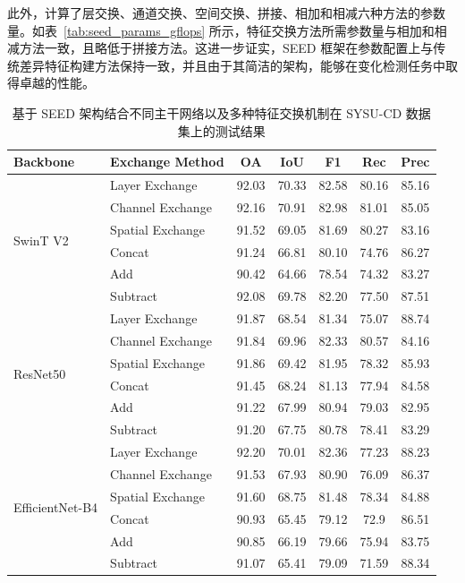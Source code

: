 此外，计算了层交换、通道交换、空间交换、拼接、相加和相减六种方法的参数量。如表~\ref{tab:seed_params_gflops} 所示，特征交换方法所需参数量与相加和相减方法一致，且略低于拼接方法。这进一步证实，SEED 框架在参数配置上与传统差异特征构建方法保持一致，并且由于其简洁的架构，能够在变化检测任务中取得卓越的性能。


\begin{table}[!htbp]
\centering
\caption{基于 SEED 架构结合不同主干网络以及多种特征交换机制在 SYSU-CD 数据集上的测试结果}
\label{tab:seed_sysu_backbone}
\begin{tabular}{l l c c c c c}
\hline
\textbf{Backbone} & \textbf{Exchange Method} & \textbf{OA} & \textbf{IoU} & \textbf{F1} & \textbf{Rec} & \textbf{Prec} \\
\hline
\multirow{6}{*}{SwinT V2}
 & Layer Exchange    & 92.03 & 70.33 & 82.58 & 80.16 & 85.16 \\
 & Channel Exchange  & 92.16 & 70.91	& 82.98	& 81.01	& 85.05 \\
 & Spatial Exchange  & 91.52 & 69.05 & 81.69 & 80.27 & 83.16 \\
\cline{2-7}
 & Concat           & 91.24 & 66.81 & 80.10 & 74.76 & 86.27 \\
 & Add              & 90.42 & 64.66 & 78.54 & 74.32 & 83.27 \\
 & Subtract            & 92.08 & 69.78 & 82.20 & 77.50 & 87.51 \\
\hline
\multirow{6}{*}{ResNet50}
 & Layer Exchange    & 91.87 & 68.54 & 81.34 & 75.07 & 88.74 \\
 & Channel Exchange  & 91.84 & 69.96 & 82.33 & 80.57 & 84.16 \\
 & Spatial Exchange  & 91.86 & 69.42 & 81.95 & 78.32 & 85.93 \\
\cline{2-7}
 & Concat           & 91.45 & 68.24 & 81.13 & 77.94 & 84.58 \\
 & Add              & 91.22 & 67.99 & 80.94 & 79.03 & 82.95 \\
 & Subtract            & 91.20 & 67.75 & 80.78 & 78.41 & 83.29 \\
\hline
\multirow{6}{*}{EfficientNet-B4}
 & Layer Exchange    & 92.20 & 70.01 & 82.36 & 77.23 & 88.23 \\
 & Channel Exchange  & 91.53 & 67.93 & 80.90 & 76.09 & 86.37 \\    %
 & Spatial Exchange  & 91.60 & 68.75 & 81.48 & 78.34 & 84.88 \\    %
\cline{2-7}
 & Concat            & 90.93	& 65.45	& 79.12	& 72.9	& 86.51 \\
 & Add               & 90.85	& 66.19	& 79.66	& 75.94	& 83.75 \\
 & Subtract             & 91.07	& 65.41	& 79.09	& 71.59	& 88.34 \\

\hline
\end{tabular}
\end{table}

